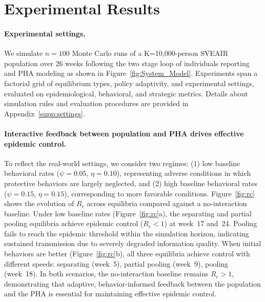 \documentclass[sigconf,review]{acmart}
\begin{document}

\section{Experimental Results}

\paragraph{Experimental settings.}
We simulate $n=100$ Monte Carlo runs of a K=10{,}000-person SVEAIR population over 26 weeks following the two stage loop of individuals reporting and PHA modeling as shown in Figure~\ref{fig:System_Model}.
Experiments span a factorial grid of equilibrium types, policy adaptivity, and experimental settings, evaluated on epidemiological, behavioral, and strategic metrics.
Details about simulation rules and evaluation procedures are provided in Appendix~\ref{supp:settings}.

\paragraph{Interactive feedback between population and PHA drives effective epidemic control.}

To reflect the real-world settings, we consider two regimes: (1) low baseline behavioral rates ($\psi=0.05$, $\eta=0.10$), representing adverse conditions in which protective behaviors are largely neglected, and (2) high baseline behavioral rates ($\psi=0.15$, $\eta=0.15$), corresponding to more favorable conditions.
Figure~\ref{fig:rc} shows the evolution of $R_c$ across equilibria compared against a no-interaction baseline. 
Under low baseline rates (Figure~\ref{fig:rc}a), the separating and partial pooling equilibria achieve epidemic control ($R_c <1$) at week~17 and~24. Pooling fails to reach the epidemic threshold within the simulation horizon, indicating sustained transmission due to severely degraded information quality.
When initial behaviors are better (Figure~\ref{fig:rc}b), all three equilibria achieve control with different speeds: separating (week~5), partial pooling (week~9), pooling (week~18). 
In both scenarios, the no-interaction baseline remains $R_c > 1$, demonstrating that adaptive, behavior-informed feedback between the population and the PHA is essential for maintaining effective epidemic control.
\end{document}
